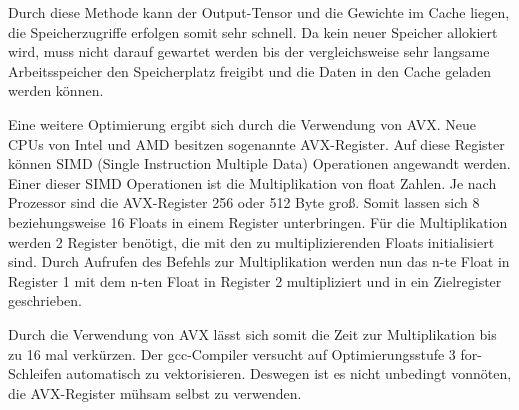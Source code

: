 \documentclass[../main.tex]{subfiles}
\begin{document}
Durch diese Methode kann der Output-Tensor und die Gewichte im Cache liegen, die Speicherzugriffe erfolgen somit sehr schnell. Da kein neuer Speicher allokiert wird, muss nicht darauf gewartet werden bis der vergleichsweise sehr langsame Arbeitsspeicher den Speicherplatz freigibt und die Daten in den Cache geladen werden können. 

Eine weitere Optimierung ergibt sich durch die Verwendung von AVX. Neue CPUs von Intel und AMD besitzen sogenannte AVX-Register. Auf diese Register können SIMD (Single Instruction Multiple Data) Operationen angewandt werden. Einer dieser SIMD Operationen ist die Multiplikation von float Zahlen.
Je nach Prozessor sind die AVX-Register 256 oder 512 Byte groß. Somit lassen sich 8 beziehungsweise 16 Floats in einem Register unterbringen. Für die Multiplikation werden 2 Register benötigt, die mit den zu multiplizierenden Floats initialisiert sind. Durch Aufrufen des Befehls zur Multiplikation werden nun das n-te Float in Register 1 mit dem n-ten Float in Register 2 multipliziert und in ein Zielregister geschrieben.

Durch die Verwendung von AVX lässt sich somit die Zeit zur Multiplikation bis zu 16 mal verkürzen. Der gcc-Compiler versucht auf Optimierungsstufe 3 for-Schleifen automatisch zu vektorisieren. Deswegen ist es nicht unbedingt vonnöten, die AVX-Register mühsam selbst zu verwenden. 
\end{document}
